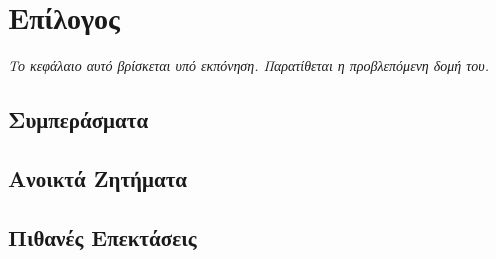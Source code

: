 \chapter{Επίλογος}
\label{ch:conclusion}

\noindent\textit{Το κεφάλαιο αυτό βρίσκεται υπό εκπόνηση. Παρατίθεται η προβλεπόμενη δομή του.}

\section{Συμπεράσματα}
\section{Ανοικτά Ζητήματα}
\section{Πιθανές Επεκτάσεις}
